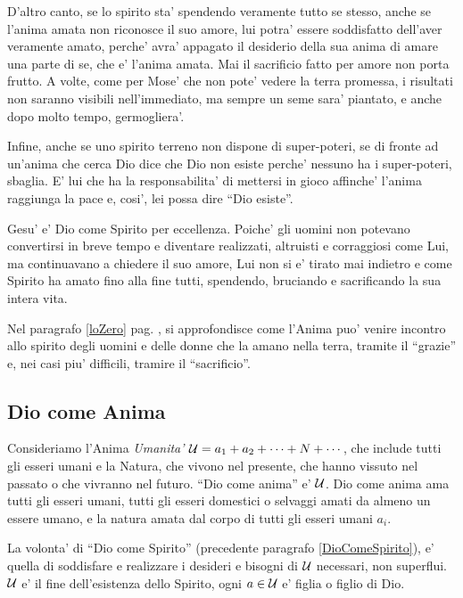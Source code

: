     D'altro canto, se lo spirito sta' spendendo veramente tutto se stesso, anche se l'anima amata non riconosce il suo amore, lui potra' essere soddisfatto dell'aver veramente amato, perche' avra' appagato il desiderio della sua anima di amare una parte di se, che e' l'anima amata. Mai il sacrificio fatto per amore non porta frutto. A volte, come per Mose' che non pote' vedere la terra promessa, i risultati non saranno visibili nell'immediato, ma sempre un seme sara' piantato, e anche dopo molto tempo, germogliera'.

    Infine, anche se uno spirito terreno non dispone di super-poteri, se di fronte ad un'anima che cerca Dio dice che Dio non esiste perche' nessuno ha i super-poteri, sbaglia. E' lui che ha la responsabilita' di mettersi in gioco affinche' l'anima raggiunga la pace e, cosi', lei possa dire ``Dio esiste''.

Gesu' e' Dio come Spirito per eccellenza. Poiche' gli uomini non potevano convertirsi in breve tempo e diventare realizzati, altruisti e corraggiosi come Lui, ma continuavano a chiedere il suo amore, Lui non si e' tirato mai indietro e come Spirito ha amato fino alla fine tutti, spendendo, bruciando e sacrificando la sua intera vita.

 Nel paragrafo \ref{loZero} pag. \pageref{loZero}, si approfondisce come l'Anima puo' venire incontro allo spirito degli uomini e delle donne che la amano nella terra, tramite il ``grazie'' e, nei casi piu' difficili, tramire il ``sacrificio''. 


\subsection{Dio come Anima}
\label{PureSoulAsGod}
\label{SecondaDefinizioneDio}

Consideriamo l'Anima \emph{Umanita'} $\mathcal{U}=a_1+a_2+\cdots+N+\cdots$, che include tutti gli esseri umani e la Natura, che vivono nel presente, che hanno vissuto nel passato o che vivranno nel futuro. ``Dio come anima'' e' $\mathcal{U}$. Dio come anima ama tutti gli esseri umani, tutti gli esseri domestici o selvaggi amati da almeno un essere umano, e la natura amata dal corpo di tutti gli esseri umani $a_i$.

La volonta' di ``Dio come Spirito'' (precedente paragrafo \ref{DioComeSpirito}), e' quella di soddisfare e realizzare i desideri e bisogni di $\mathcal{U}$ necessari, non superflui. $\mathcal{U}$ e' il fine dell'esistenza dello Spirito, ogni $a\in \mathcal{U}$ e' figlia o figlio di Dio.


